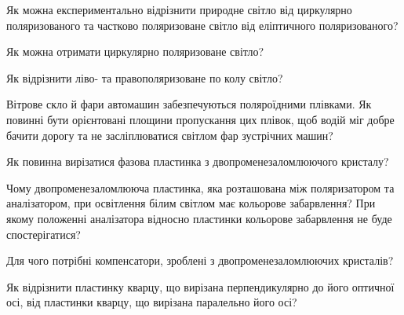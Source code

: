 \begin{problem}%
    Як можна експериментально відрізнити природне світло від циркулярно поляризованого та частково поляризоване світло від еліптичного поляризованого?
\end{problem}

\begin{problem}%
    Як можна отримати циркулярно поляризоване світло?
\end{problem}

\begin{problem}%
    Як відрізнити ліво- та правополяризоване по колу світло?
\end{problem}

\begin{problem}%
    Вітрове скло й фари автомашин забезпечуються поляроїдними плівками. Як повинні бути орієнтовані площини пропускання цих плівок, щоб водій міг добре бачити дорогу та не засліплюватися світлом фар зустрічних машин?
\end{problem}

\begin{problem}%
    Як повинна вирізатися фазова пластинка з двопроменезаломлюючого
    кристалу?
\end{problem}

\begin{problem}%
     Чому двопроменезаломлююча пластинка, яка розташована між поляризатором та аналізатором, при освітлення білим світлом має кольорове забарвлення? При якому положенні аналізатора відносно пластинки кольорове забарвлення не буде спостерігатися?
\end{problem}

\begin{problem}%
    Для чого потрібні компенсатори, зроблені з двопроменезаломлюючих
    кристалів?
\end{problem}


\begin{problem}%
    Як відрізнити пластинку кварцу, що вирізана перпендикулярно до його оптичної осі, від пластинки кварцу, що вирізана паралельно його осі?
\end{problem}

